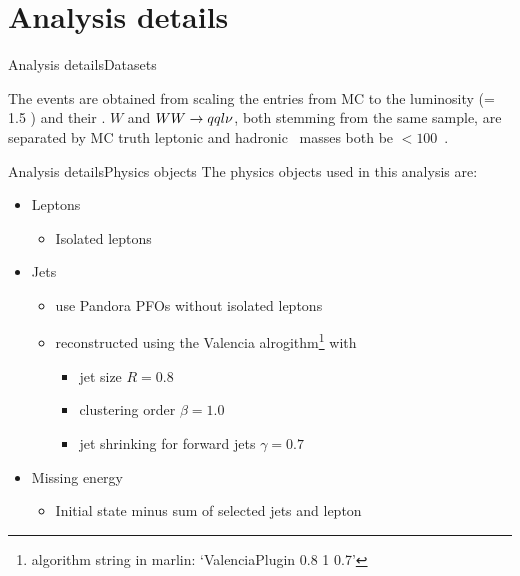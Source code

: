 
\section{Analysis details}

\begin{frame}{Analysis details}{Datasets}

\vspace{-0.5cm}
The events are obtained from scaling the entries from MC to the luminosity (\lumi = 1.5 \invab) and their \xsec.
%
$W$ and $WW\rightarrow qql\nu$, both stemming from the same sample, are separated by MC truth leptonic and hadronic \Wboson\ masses both be $< 100$~\GeV.
\end{frame}


\begin{frame}{Analysis details}{Physics objects}
The physics objects used in this analysis are:
\begin{itemize}
  \item Leptons
  \begin{itemize}
    \item Isolated leptons
  \end{itemize}
  \item Jets
  \begin{itemize}
    \item use Pandora PFOs without isolated leptons
    \item reconstructed using the Valencia alrogithm\footnote{algorithm string in marlin: `ValenciaPlugin 0.8 1 0.7'} with
    \begin{itemize}
      \item jet size $R=0.8$
      \item clustering order $\beta=1.0$
      \item jet shrinking for forward jets $\gamma=0.7$
    \end{itemize}
  \end{itemize}
  \item Missing energy
  \begin{itemize}
    \item Initial state minus sum of selected jets and lepton
  \end{itemize}
\end{itemize}
\end{frame}



